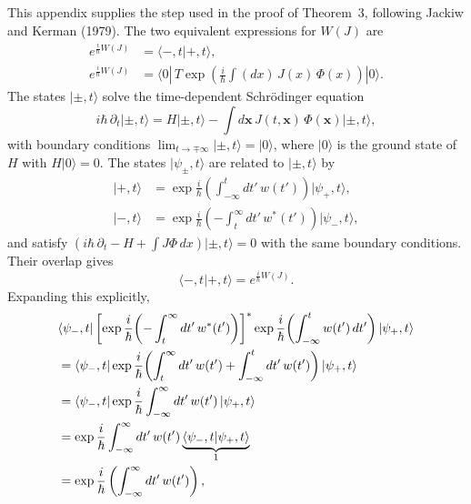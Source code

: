 This appendix supplies the step used in the proof of Theorem~3, following
Jackiw and Kerman (1979). The two equivalent expressions for $W(J)$ are
\begin{align}
	e^{\frac{i}{\hbar}W(J)} & = \langle-,t|+,t\rangle,                   \\
	e^{\frac{i}{\hbar}W(J)} & = \langle 0|\,T\exp\!\left(\frac{i}{\hbar}
	\int(dx)\,J(x)\,\Phi(x)\right)|0\rangle.
\end{align}
The states $|\pm,t\rangle$ solve the time-dependent Schr\"odinger equation
\begin{equation}
	i\hbar\,\partial_t|\pm,t\rangle
	= H|\pm,t\rangle
	- \int d\mathbf{x}\,J(t,\mathbf{x})\,\Phi(\mathbf{x})|\pm,t\rangle,
\end{equation}
with boundary conditions $\lim_{t\to\mp\infty}|\pm,t\rangle = |0\rangle$,
where $|0\rangle$ is the ground state of $H$ with $H|0\rangle = 0$. The
states $|\psi_\pm,t\rangle$ are related to $|\pm,t\rangle$ by
\begin{align}
	|+,t\rangle & = \exp\frac{i}{\hbar}\!\left(\int_{-\infty}^{t}dt'\,w(t')\right)|\psi_+,t\rangle,   \\
	|-,t\rangle & = \exp\frac{i}{\hbar}\!\left(-\int_{t}^{\infty}dt'\,w^*(t')\right)|\psi_-,t\rangle,
\end{align}
and satisfy $\left(i\hbar\,\partial_t - H + \int J\Phi\,dx\right)|\pm,t\rangle
	= 0$ with the same boundary conditions. Their overlap gives
\begin{equation}
	\langle-,t|+,t\rangle = e^{\frac{i}{\hbar}W(J)}.
\end{equation}
Expanding this explicitly,
\begin{align}
	 & \langle\psi_-,t|\left[\exp\frac{i}{\hbar}\!\left(-\int_t^{\infty}dt'\,w^*(t')\right)\right]^*
	\exp\frac{i}{\hbar}\!\left(\int_{-\infty}^{t}w(t')\,dt'\right)|\psi_+,t\rangle \notag              \\
	 & = \langle\psi_-,t|\exp\frac{i}{\hbar}\!\left(\int_t^{\infty}dt'\,w(t')
	+ \int_{-\infty}^{t}dt'\,w(t')\right)|\psi_+,t\rangle \notag                                       \\
	 & = \langle\psi_-,t|\exp\frac{i}{\hbar}\int_{-\infty}^{\infty}dt'\,w(t')\,|\psi_+,t\rangle \notag \\
	 & = \exp\frac{i}{\hbar}\int_{-\infty}^{\infty}dt'\,w(t')
	\underbrace{\langle\psi_-,t|\psi_+,t\rangle}_{1} \notag                                            \\
	 & = \exp\frac{i}{\hbar}\left(\int_{-\infty}^{\infty}dt'\,w(t')\right),
\end{align}
